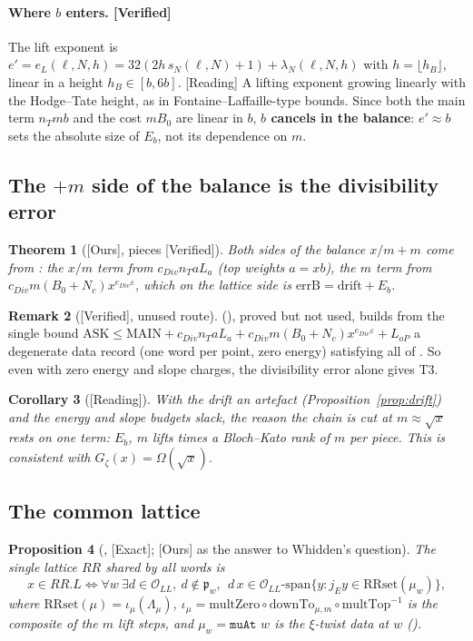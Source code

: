 \documentclass[11pt]{article}
\newcommand{\Exact}{\textcolor{exactc}{\textsf{\small[Exact]}}}
\newcommand{\Verified}{\textcolor{verc}{\textsf{\small[Verified]}}}
\newcommand{\Reading}{\textcolor{readc}{\textsf{\small[Reading]}}}
\newcommand{\Ours}{\textcolor{oursc}{\textsf{\small[Ours]}}}
\newcommand{\eps}{\varepsilon}
\newcommand{\Oc}{\mathcal{O}}
\newcommand{\ASK}{\mathrm{ASK}}
\newcommand{\MAIN}{\mathrm{MAIN}}
\newcommand{\Gz}{G_\zeta}
\theoremstyle{plain}
\newtheorem{theorem}{Theorem}[section]
\newtheorem{proposition}[theorem]{Proposition}
\newtheorem{corollary}[theorem]{Corollary}
\theoremstyle{definition}
\newtheorem{remark}[theorem]{Remark}
\begin{document}
\paragraph{Where $b$ enters. \Verified}
The lift exponent is
$e'=e_L(\ell,N,h)=32(2h\,s_N(\ell,N)+1)+\lambda_N(\ell,N,h)$ with $h=\lfloor h_B\rfloor$, linear in
a height $h_B\in[b,6b]$. \Reading{} A lifting exponent growing linearly with the Hodge--Tate height,
as in Fontaine--Laffaille-type bounds. Since both the main term $n_Tmb$ and the cost $mB_0$ are linear
in $b$, \textbf{$b$ cancels in the balance}: $e'\approx b$ sets the absolute size of $E_b$, not its
dependence on $m$.

\subsection{The $+m$ side of the balance is the divisibility error}

\begin{theorem}[\Ours, pieces \Verified]
Both sides of the balance $x/m+m$ come from : the $x/m$ term from $c_{Div}n_TaL_a$ (top
weights $a=xb$), the $m$ term from $c_{Div}m(B_0+N_c)x^{e_{Div}\eps}$, which on the lattice side is
$\mathrm{errB}=\text{drift}+E_b$.
\end{theorem}

\begin{remark}[\Verified, unused route]
 (), proved but not used, builds from the single
bound $\ASK\le\MAIN+c_{Div}n_TaL_a+c_{Div}m(B_0+N_c)x^{e_{Div}\eps}+L_{oP}$ a degenerate data record
(one word per point, zero energy) satisfying all of . So even with zero energy and
slope charges, the divisibility error alone gives T3.
\end{remark}

\begin{corollary}[\Reading]
With the drift an artefact (Proposition~\ref{prop:drift}) and the energy and slope budgets slack, the
reason the chain is cut at $m\approx\sqrt{x}$ rests on one term: $E_b$, $m$ lifts times a Bloch--Kato
rank of $m$ per piece. This is consistent with $\Gz(x)=\Omega(\sqrt{x})$.
\end{corollary}

\subsection{The common lattice}\label{sec:RR}

\begin{proposition}[, \Exact; \Ours{} as the answer to Whidden's question]
The single lattice $RR$ shared by all words is
\[
x\in RR.L\iff \forall w\ \exists d\in\Oc_{LL},\ d\notin\mathfrak p_w,\ \ d\,x\in\Oc_{LL}\text{-span}\{y : j_E y\in \mathrm{RRset}(\mu_w)\},
\]
where $\mathrm{RRset}(\mu)=\iota_\mu(\Lambda_\mu)$, $\iota_\mu=\mathrm{multZero}\circ\mathrm{downTo}_{\mu,m}\circ\mathrm{multTop}^{-1}$
is the composite of the $m$ lift steps, and $\mu_w=\texttt{muAt }w$ is the $\xi$-twist data at $w$
().
\end{proposition}
\end{document}
